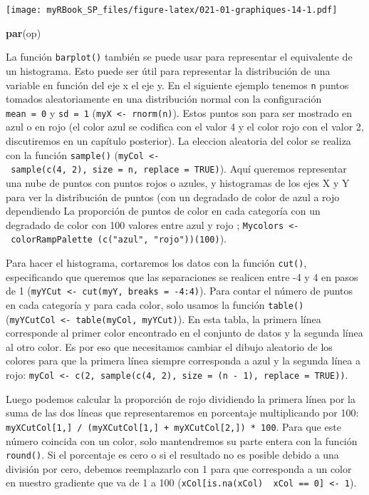 \documentclass[
]{book}
\newenvironment{Shaded}{\begin{snugshade}}{\end{snugshade}}
\newcommand{\KeywordTok}[1]{\textcolor[rgb]{0.13,0.29,0.53}{\textbf{#1}}}
\newcommand{\NormalTok}[1]{#1}
\begin{document}
\texttt{[image: myRBook\_SP\_files/figure-latex/021-01-graphiques-14-1.pdf]}

\begin{Shaded}
\begin{Highlighting}[]
\KeywordTok{par}\NormalTok{(op)}
\end{Highlighting}
\end{Shaded}

La función \texttt{barplot()} también se puede usar para representar el equivalente de un histograma. Esto puede ser útil para representar la distribución de una variable en función del eje x el eje y. En el siguiente ejemplo tenemos \texttt{n} puntos tomados aleatoriamente en una distribución normal con la configuración \texttt{mean\ =\ 0} y \texttt{sd\ =\ 1} (\texttt{myX\ \textless{}-\ rnorm(n)}). Estos puntos son para ser mostrado en azul o en rojo (el color azul se codifica con el valor 4 y el color rojo con el valor 2, discutiremos en un capítulo posterior). La eleccion aleatoria del color se realiza con la función \texttt{sample()} (\texttt{myCol\ \textless{}-\ sample(c(4,\ 2),\ size\ =\ n,\ replace\ =\ TRUE)}). Aquí queremos representar una nube de puntos con puntos rojos o azules, y histogramas de los ejes X y Y para ver la distribución de puntos (con un degradado de color de azul a rojo dependiendo La proporción de puntos de color en cada categoría con un degradado de color con 100 valores entre azul y rojo ; \texttt{Mycolors\ \textless{}-\ colorRampPalette\ (c("azul",\ "rojo"))(100)}).

Para hacer el histograma, cortaremos los datos con la función \texttt{cut()}, especificando que queremos que las separaciones se realicen entre -4 y 4 en pasos de 1 (\texttt{myYCut\ \textless{}-\ cut(myY,\ breaks\ =\ -4:4)}). Para contar el número de puntos en cada categoría y para cada color, solo usamos la función \texttt{table()} (\texttt{myYCutCol\ \textless{}-\ table(myCol,\ myYCut)}). En esta tabla, la primera línea corresponde al primer color encontrado en el conjunto de datos y la segunda línea al otro color. Es por eso que necesitamos cambiar el dibujo aleatorio de los colores para que la primera línea siempre corresponda a azul y la segunda línea a rojo: \texttt{myCol\ \textless{}-\ c(2,\ sample(c(4,\ 2),\ size\ =\ (n\ -\ 1),\ replace\ =\ TRUE))}.

Luego podemos calcular la proporción de rojo dividiendo la primera línea por la suma de las dos líneas que representaremos en porcentaje multiplicando por 100: \texttt{myXCutCol{[}1,{]}\ /\ (myXCutCol{[}1,{]}\ +\ myXCutCol{[}2,{]})\ *\ 100}. Para que este número coincida con un color, solo mantendremos su parte entera con la función \texttt{round()}. Si el porcentaje es cero o si el resultado no es posible debido a una división por cero, debemos reemplazarlo con 1 para que corresponda a un color en nuestro gradiente que va de 1 a 100 (\texttt{xCol{[}is.na(xCol)\ \textbar{}\ xCol\ ==\ 0{]}\ \textless{}-\ 1}).
\end{document}

